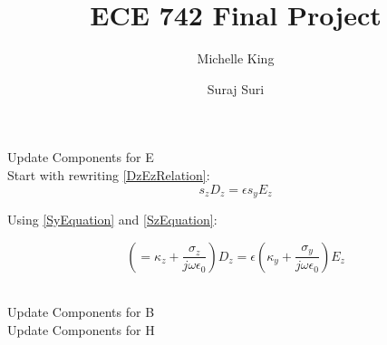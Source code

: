\message{ !name(ECE742Project.tex)}\documentclass{article}
\title{ECE 742 Final Project}
\author{
  Michelle King
  \and
  Suraj Suri
  }
\begin{document}


 
 Update Components for E\\

 Start with rewriting \ref{DzEzRelation}:
 \begin{equation}s_{z}D_{z}=\epsilon s_{y}E_{z}\end{equation}

 Using \ref{SyEquation} and \ref{SzEquation}:

 \begin{equation}(=\kappa_{z}+\frac{\sigma_{z}}{j\omega\epsilon_{0}})D_{z}=\epsilon (\kappa_{y}+\frac{\sigma_{y}}{j\omega\epsilon_{0}})E_{z}\end{equation}
 
\\
Update Components for B\\
Update Components for H


\end{document}
